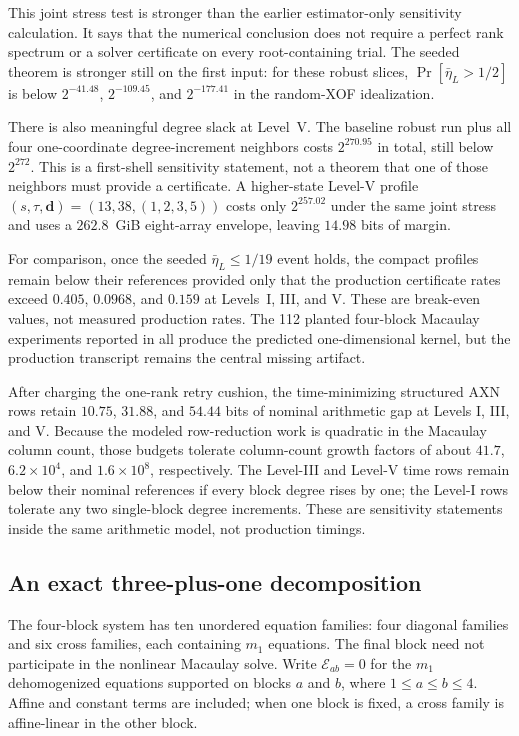 \documentclass[11pt]{article}
\begin{document}
This joint stress test is stronger than the earlier estimator-only sensitivity
calculation.  It says that the numerical conclusion does not require a perfect
rank spectrum or a solver certificate on every root-containing trial.  The
seeded theorem is stronger still on the first input: for these robust slices,
$\Pr[\bar\eta_L>1/2]$ is below $2^{-41.48}$, $2^{-109.45}$, and
$2^{-177.41}$ in the random-XOF idealization.

There is also meaningful degree slack at Level~V.  The baseline robust run plus
all four one-coordinate degree-increment neighbors costs $2^{270.95}$ in
total, still below $2^{272}$.  This is a first-shell sensitivity statement,
not a theorem that one of those neighbors must provide a certificate.  A
higher-state Level-V profile $(s,\tau,\mathbf d)=(13,38,(1,2,3,5))$ costs only
$2^{257.02}$ under the same joint stress and uses a $262.8$~GiB eight-array
envelope, leaving $14.98$ bits of margin.

For comparison, once the seeded $\bar\eta_L\le1/19$ event holds, the compact
profiles remain below their references provided only that the production
certificate rates exceed $0.405$, $0.0968$, and $0.159$ at Levels~I, III, and
V.  These are break-even values, not measured production rates.  The 112
planted four-block Macaulay experiments reported in  all
produce the predicted one-dimensional kernel, but the production transcript
remains the central missing artifact.

After charging the one-rank retry cushion, the time-minimizing structured AXN
rows retain $10.75$, $31.88$, and $54.44$ bits of nominal arithmetic gap at
Levels I, III, and V.  Because the modeled row-reduction work is quadratic in
the Macaulay column count, those budgets tolerate column-count growth factors
of about $41.7$, $6.2\times10^4$, and $1.6\times10^8$, respectively.  The
Level-III and Level-V time rows remain below their nominal references if every
block degree rises by one; the Level-I rows tolerate any two single-block
degree increments.  These are sensitivity statements inside the same
arithmetic model, not production timings.

\subsection{An exact three-plus-one decomposition}
\label{sec:three-plus-one}

The four-block system has ten unordered equation families: four diagonal
families and six cross families, each containing $m_1$ equations.  The final
block need not participate in the nonlinear Macaulay solve.  Write
$\mathcal E_{ab}=0$ for the $m_1$ dehomogenized equations supported on blocks
$a$ and $b$, where $1\le a\le b\le4$.  Affine and constant terms are included;
when one block is fixed, a cross family is affine-linear in the other block.
\end{document}
